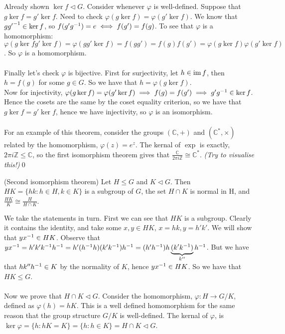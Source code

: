 \documentclass{article}
\newcommand{\nrm}{\triangleleft}
\begin{document}
\begin{itemize}
\begin{theorem}
\end{theorem}
\pf Already shown $ \ker f\nrm G $. Consider whenever $ \varphi $ is well-defined. Suppose that $ g\ker f=g'\ker f. $ Need to check $ \varphi(g\ker f)=\varphi(g'\ker f). $ We know that $ g{g'}^{-1}\in \ker f $, so $ f(g'{g}^{-1})=e\iff f(g')=f(g) $. To see that $ \varphi $ is a homomorphism: $ \varphi(g\ker f g'\ker f)=\varphi(gg'\ker f)=f(gg')=f(g)f(g')=\varphi(g\ker f)\varphi(g'\ker f) $. So $ \varphi $ is a homomorphism.\\\\
Finally let's check $ \varphi $ is bijective. First for surjectivity, let $ h\in \operatorname{im} f $, then $ h=f(g) $ for some $ g\in G $. So we have that $ h=\varphi(g\ker f) $.\\
Now for injectivity, $ \varphi(g\ker f)=\varphi(g'\ker f)\implies f(g)=f(g') \implies g'{g}^{-1}\in\ker f $. Hence the cosets are the same by the coset equality criterion, so we have that $ g\ker f=g'\ker f $, hence we have injectivity, so $ \varphi $ is an isomorphism.\\
\\
For an example of this theorem, consider the groups $ (\mathbb C, +) $ and $ (\mathbb C^*, \times) $ related by the homomorphism, $ \varphi(z)= e^z$. The kernal of $ \exp $ is exactly, $ 2\pi i \mathbb Z\le \mathbb C $, so the first isomorphism theorem gives that $ \frac{\mathbb C}{2\pi i \mathbb Z}\cong \mathbb C^* $. \textit{(Try to visualise this!)}\qed 
\begin{theorem}
	(Second isomorphism theorem) Let $ H\le G $ and $ K\nrm G $. Then $ HK=\{hk : h\in H, k\in K\} $ is a subgroup of $ G $, the set $ H\cap K$ is normal in H, and $ \frac{HK}K\cong \frac H{H\cap K} $.
\end{theorem}
\pf We take the statements in turn. First we can see that $ HK $ is a subgroup. Clearly it contains the identity, and take some $ x,y\in HK $, $ x=hk, y=h'k' $. We will show that $ y{x}^{-1}\in HK $. Observe that $ y{x}^{-1} = h'k'{k}^{-1} {h}^{-1} = h'({h}^{-1} h)(k' {k}^{-1}){h}^{-1} = (h'{h}^{-1})h\underbrace{(k'{k}^{-1})}_{k''}{h}^{-1} $. But we have that $ hk''{h}^{-1} \in K $ by the normality of $ K $, hence $ y{x}^{-1} \in HK $. So we have that $ HK\le G $.\\\\
Now we prove that $ H\cap K\nrm G $. Consider the homomorphism, $ \varphi: H\to G/K $, defined as $ \varphi(h)=hK $. This is a well defined homomorphism for the same reason that the group structure $ G/K $ is well-defined. The kernal of $ \varphi $, is $ \ker \varphi = \{h: hK=K\}=\{h:h\in K\}=H\cap K\nrm G $.\\\\

\end{itemize}
\end{document}
